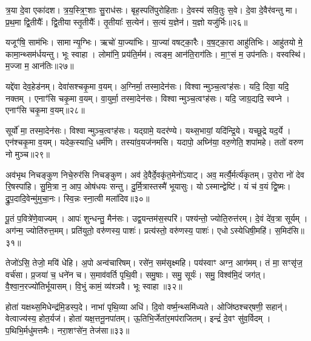 त्र॒या दे॒वा एका॑दश।
त्र॒य॒स्त्रि॒ꣳ॒शाः सु॒राध॑सः।
बृह॒स्पति॑पुरो\-हिताः।
दे॒वस्य॑ सवि॒तुः स॒वे।
दे॒वा दे॒वैर॑वन्तु मा।
प्र॒थ॒मा द्वि॒तीयैः᳚।
द्वि॒तीयास्तृ॒तीयैः᳚।
तृ॒तीयाः᳚ स॒त्येन॑।
स॒त्यं य॒ज्ञेन॑।
य॒ज्ञो यजु॑र्भिः॥२६॥

यजूꣳ॑षि॒ साम॑भिः।
सामान्यृ॒ग्भिः।
ऋचो॑ या॒ज्या॑भिः।
या॒ज्या॑ वषट्का॒रैः।
व॒ष॒ट्का॒रा आहु॑तिभिः।
आहु॑तयो मे॒ कामा॒न्थ्सम॑र्धयन्तु।
भूः स्वाहा।
लोमा॑नि॒ प्रय॑ति॒र्मम॑।
त्वङ्म॒ आन॑ति॒राग॑तिः।
मा॒ꣳ॒सं म॒ उप॑नतिः।
वस्वस्थि॑।
म॒ज्जा म॒ आन॑तिः॥२७॥\anuvakamend[प॒स्त्यास्वा सर॑स्वत्यै॒ भैष॑ज्येन॒ श्रीरङ्गा॑नि भ॒सद्य॒ज्ञे य॒ज्ञो यजु॑र्भि॒रुप॑नति॒र्द्वे च॑]

यद्दे॑वा देव॒हेड॑नम्।
देवा॑सश्चकृ॒मा व॒यम्।
अ॒ग्निर्मा॒ तस्मा॒देन॑सः।
विश्वान्मुञ्च॒त्वꣳह॑सः।
यदि॒ दिवा॒ यदि॒ नक्तम्।
एनाꣳ॑सि चकृ॒मा व॒यम्।
वा॒युर्मा॒ तस्मा॒देन॑सः।
विश्वान्मुञ्च॒त्वꣳह॑सः।
यदि॒ जाग्र॒द्यदि॒ स्वप्ने।
एनाꣳ॑सि चकृ॒मा व॒यम्॥२८॥

सूर्यो॑ मा॒ तस्मा॒देन॑सः।
विश्वान्मुञ्च॒त्वꣳह॑सः।
यद्ग्रामे॒ यदर॑ण्ये।
यथ्स॒भायां॒ यदि॑न्द्रि॒ये।
यच्छू॒द्रे यद॒र्ये।
एन॑श्चकृ॒मा व॒यम्।
यदेक॒स्याधि॒ धर्म॑णि।
तस्या॑व॒यज॑नमसि।
यदापो॒ अघ्नि॑या॒ वरु॒णेति॒ शपा॑महे।
ततो॑ वरुण नो मुञ्च॥२९॥

अव॑भृथ निचङ्कुण निचे॒रुर॑सि निचङ्कुण।
अव॑ दे॒वैर्दे॒वकृ॑त॒मेनो॑\-ऽयाट्।
अव॒ मर्त्यै॒र्मर्त्य॑कृतम्।
उ॒रोरा नो॑ देव रि॒षस्पा॑हि।
सु॒मि॒त्रा न॒ आप॒ ओष॑धयः सन्तु।
दु॒र्मि॒त्रास्तस्मै॑ भूयासुः।
योऽस्मान्द्वेष्टि॑।
यं च॑ व॒यं द्वि॒ष्मः।
द्रु॒प॒दादि॒वेन्मु॑मुचा॒नः।
स्वि॒न्नः स्ना॒त्वी मला॑दिव॥३०॥

पू॒तं प॒वित्रे॑णे॒वाज्यम्।
आपः॑ शुन्धन्तु॒ मैन॑सः।
उद्व॒यन्तम॑स॒स्परि॑।
पश्य॑न्तो॒ ज्योति॒रुत्त॑रम्।
दे॒वं दे॑व॒त्रा सूर्यम्।
अग॑न्म॒ ज्योति॑रुत्त॒मम्।
प्रति॑युतो॒ वरु॑णस्य॒ पाशः॑।
प्रत्य॑स्तो॒ वरु॑णस्य॒ पाशः॑।
एधोऽस्येधिषी॒महि॑।
स॒मिद॑सि॥३१॥

तेजो॑ऽसि॒ तेजो॒ मयि॑ धेहि।
अ॒पो अन्व॑चारिषम्।
रसे॑न॒ सम॑सृक्ष्महि।
पय॑स्वाꣳ अग्न॒ आग॑मम्।
तं मा॒ सꣳसृ॑ज॒ वर्च॑सा।
प्र॒जया॑ च॒ धने॑न च।
स॒माव॑वर्ति पृथि॒वी।
समु॒षाः।
समु॒ सूर्यः॑।
समु॒ विश्व॑मि॒दं जग॑त्।
वै॒श्वा॒न॒रज्यो॑तिर्भूयासम्।
वि॒भुं कामं॒ व्य॑श्ञवै।
भूः स्वाहा॥३२॥\anuvakamend[स्वप्न॒ एनाꣳ॑सि चकृ॒मा व॒यं मु॑ञ्च॒ मला॑दिव स॒मिद॑सि॒ जग॒त्रीणि॑ च]

होता॑ यक्षथ्स॒मिधेन्द्र॑मि॒डस्प॒दे।
नाभा॑ पृथि॒व्या अधि॑।
दि॒वो वर्ष्म॒न्थ्समि॑ध्यते।
ओजि॑ष्ठश्चर्‌\mbox{}षणी॒ सहान्॑।
वेत्वाज्य॑स्य॒ होत॒र्यज॑।
होता॑ यक्ष॒त्तनू॒नपा॑तम्।
ऊ॒तिभि॒र्जेता॑र॒मप॑राजितम्।
इन्द्रं॑ दे॒वꣳ सु॑व॒र्विदम्।
प॒थिभि॒र्मधु॑मत्तमैः।
नरा॒शꣳसे॑न॒ तेज॑सा॥३३॥

